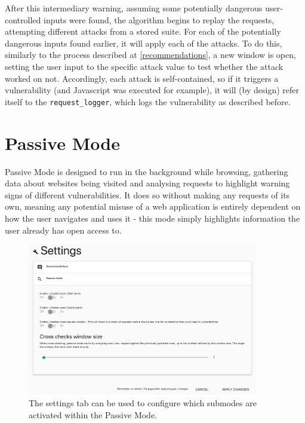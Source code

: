 After this intermediary warning, assuming some potentially dangerous user-controlled inputs were found, the algorithm begins to replay the requests, attempting different attacks from a stored suite. For each of the potentially dangerous inputs found earlier, it will apply each of the attacks. To do this, similarly to the process described at \ref{recommendations}, a new window is open, setting the user input to the specific attack value to test whether the attack worked on not. Accordingly, each attack is self-contained, so if it triggers a vulnerability (and Javascript was executed for example), it will (by design) refer itself to the \texttt{request\_logger}, which logs the vulnerability as described before.


\section{Passive Mode}

Passive Mode is designed to run in the background while browsing, gathering data about websites being visited and analysing requests to highlight warning signs of different vulnerabilities. It does so without making any requests of its own, meaning any potential misuse of a web application is entirely dependent on how the user navigates and uses it - this mode simply highlights information the user already has open access to. \\

\begin{figure}[h]
	\centering
	\includegraphics[width=0.9\textwidth]{images/passive_mode_settings.png}
	\caption{The settings tab can be used to configure which submodes are activated within the Passive Mode.}
	\label{fig:test}
\end{figure}

